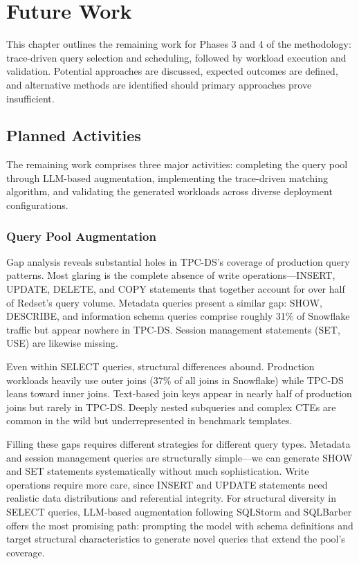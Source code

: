 \documentclass[12pt]{report}
\begin{document}
\chapter{Future Work}
\label{ch:future}

This chapter outlines the remaining work for Phases 3 and 4 of the methodology: trace-driven query selection and scheduling, followed by workload execution and validation. Potential approaches are discussed, expected outcomes are defined, and alternative methods are identified should primary approaches prove insufficient.

\section{Planned Activities}
\label{sec:planned}

The remaining work comprises three major activities: completing the query pool through LLM-based augmentation, implementing the trace-driven matching algorithm, and validating the generated workloads across diverse deployment configurations.

\subsection{Query Pool Augmentation}
\label{subsec:pool-augmentation}

Gap analysis reveals substantial holes in TPC-DS's coverage of production query patterns. Most glaring is the complete absence of write operations---INSERT, UPDATE, DELETE, and COPY statements that together account for over half of Redset's query volume. Metadata queries present a similar gap: SHOW, DESCRIBE, and information schema queries comprise roughly 31\% of Snowflake traffic \cite{snowset} but appear nowhere in TPC-DS. Session management statements (SET, USE) are likewise missing.

Even within SELECT queries, structural differences abound. Production workloads heavily use outer joins (37\% of all joins in Snowflake) while TPC-DS leans toward inner joins. Text-based join keys appear in nearly half of production joins but rarely in TPC-DS. Deeply nested subqueries and complex CTEs are common in the wild but underrepresented in benchmark templates.

Filling these gaps requires different strategies for different query types. Metadata and session management queries are structurally simple---we can generate SHOW and SET statements systematically without much sophistication. Write operations require more care, since INSERT and UPDATE statements need realistic data distributions and referential integrity. For structural diversity in SELECT queries, LLM-based augmentation following SQLStorm \cite{sqlstorm} and SQLBarber \cite{sqlbarber} offers the most promising path: prompting the model with schema definitions and target structural characteristics to generate novel queries that extend the pool's coverage.
\end{document}
